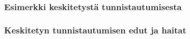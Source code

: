 
\subsubsection{Esimerkki keskitetystä tunnistautumisesta}

\subsubsection{Keskitetyn tunnistautumisen edut ja haitat}
